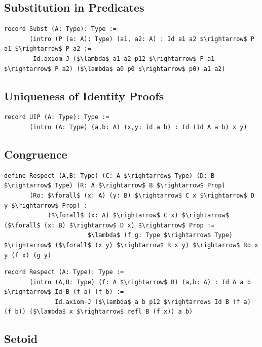 \documentclass[11pt,oneside]{article}
\begin{document}
\subsection{Substitution in Predicates}

\begin{lstlisting}[mathescape=true]
record Subst (A: Type): Type :=
       (intro (P (a: A): Type) (a1, a2: A) : Id a1 a2 $\rightarrow$ P a1 $\rightarrow$ P a2 :=
        Id.axiom-J ($\lambda$ a1 a2 p12 $\rightarrow$ P a1 $\rightarrow$ P a2) ($\lambda$ a0 p0 $\rightarrow$ p0) a1 a2)
\end{lstlisting}

\subsection{Uniqueness of Identity Proofs}

\begin{lstlisting}[mathescape=true]
record UIP (A: Type): Type :=
       (intro (A: Type) (a,b: A) (x,y: Id a b) : Id (Id A a b) x y)
\end{lstlisting}

\subsection{Congruence}

\begin{lstlisting}[mathescape=true]
define Respect (A,B: Type) (C: A $\rightarrow$ Type) (D: B $\rightarrow$ Type) (R: A $\rightarrow$ B $\rightarrow$ Prop)
       (Ro: $\forall$ (x: A) (y: B) $\rightarrow$ C x $\rightarrow$ D y $\rightarrow$ Prop) :
            ($\forall$ (x: A) $\rightarrow$ C x) $\rightarrow$ ($\forall$ (x: B) $\rightarrow$ D x) $\rightarrow$ Prop :=
                       $\lambda$ (f g: Type $\rightarrow$ Type) $\rightarrow$ ($\forall$ (x y) $\rightarrow$ R x y) $\rightarrow$ Ro x y (f x) (g y)
\end{lstlisting}

\begin{lstlisting}[mathescape=true]
record Respect (A: Type): Type :=
       (intro (A,B: Type) (f: A $\rightarrow$ B) (a,b: A) : Id A a b $\rightarrow$ Id B (f a) (f b) :=
              Id.axiom-J ($\lambda$ a b p12 $\rightarrow$ Id B (f a) (f b)) ($\lambda$ x $\rightarrow$ refl B (f x)) a b)
\end{lstlisting}

\subsection{Setoid}
\end{document}
